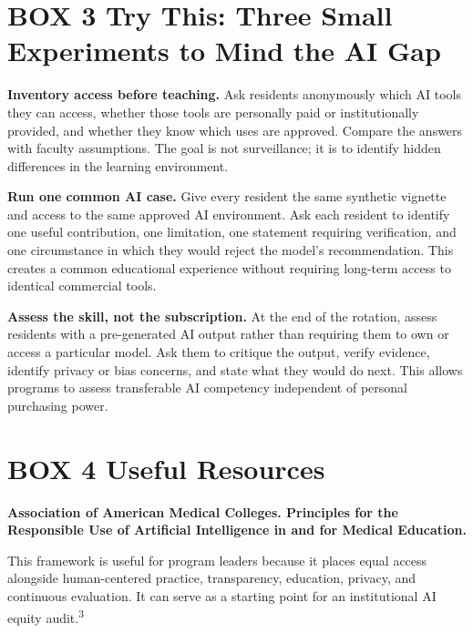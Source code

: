 \documentclass[12pt]{article}
\begin{document}
\section*{BOX 3 \quad Try This: Three Small Experiments to Mind the AI Gap}

\textbf{Inventory access before teaching.}
Ask residents anonymously which AI tools they can access, whether those tools
are personally paid or institutionally provided, and whether they know which
uses are approved. Compare the answers with faculty assumptions. The goal is
not surveillance; it is to identify hidden differences in the learning
environment.

\vspace{0.6em}

\textbf{Run one common AI case.}
Give every resident the same synthetic vignette and access to the same approved
AI environment. Ask each resident to identify one useful contribution, one
limitation, one statement requiring verification, and one circumstance in which
they would reject the model's recommendation. This creates a common educational
experience without requiring long-term access to identical commercial tools.

\vspace{0.6em}

\textbf{Assess the skill, not the subscription.}
At the end of the rotation, assess residents with a pre-generated AI output
rather than requiring them to own or access a particular model. Ask them to
critique the output, verify evidence, identify privacy or bias concerns, and
state what they would do next. This allows programs to assess transferable AI
competency independent of personal purchasing power.

\section*{BOX 4 \quad Useful Resources}

\textbf{Association of American Medical Colleges. Principles for the Responsible
Use of Artificial Intelligence in and for Medical Education.}

This framework is useful for program leaders because it places equal access
alongside human-centered practice, transparency, education, privacy, and
continuous evaluation. It can serve as a starting point for an institutional
AI equity audit.\textsuperscript{3}

\vspace{0.8em}
\end{document}
